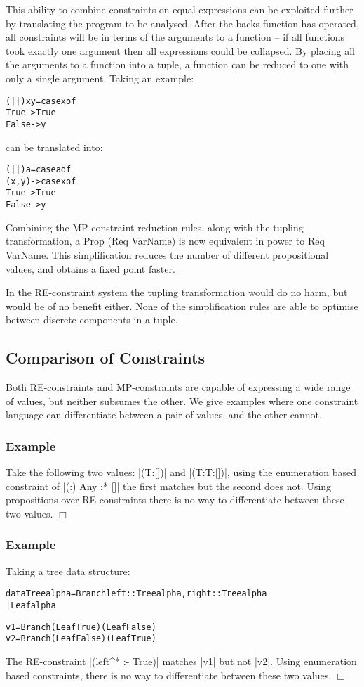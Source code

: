 \documentclass[preprint]{sigplanconf}
\newcommand{\C}[1]{\textsf{#1}}
\newcounter{exmp}
\newcommand{\yesexample}{\subsubsection*{Example \arabic{exmp}}\addtocounter{exmp}{1}}
\newcommand{\noexample}{\hfill$\Box$}
\newenvironment{code}{\begin{alltt}\small}{\end{alltt}}
\newenvironment{example}{\yesexample}{\noexample}
\begin{document}
This ability to combine constraints on equal expressions can be exploited further by translating the program to be analysed. After the \C{backs} function has operated, all constraints will be in terms of the arguments to a function -- if all functions took exactly one argument then all expressions could be collapsed. By placing all the arguments to a function into a tuple, a function can be reduced to one with only a single argument. Taking an example:

\begin{code}
(||) x y = case  x of
                 True   -> True
                 False  -> y
\end{code}

\noindent can be translated into:

\begin{code}
(||) a = case  a of
               (x,y) -> case  x of
                              True    -> True
                              False   -> y
\end{code}

Combining the MP-constraint reduction rules, along with the tupling transformation, a \C{Prop (Req VarName)} is now equivalent in power to \C{Req VarName}. This simplification reduces the number of different propositional values, and obtains a fixed point faster.

In the RE-constraint system the tupling transformation would do no harm, but would be of no benefit either. None of the simplification rules are able to optimise between discrete components in a tuple.

\subsection{Comparison of Constraints}

Both RE-constraints and MP-constraints are capable of expressing a wide range of values, but neither subsumes the other. We give examples where one constraint language can differentiate between a pair of values, and the other cannot.

\begin{example}
Take the following two values: |(T:[])| and |(T:T:[])|, using the enumeration based constraint of |{(:) Any} :* {[]}| the first matches but the second does not. Using propositions over RE-constraints there is no way to differentiate between these two values.
\end{example}

\begin{example}
Taking a tree data structure:

\begin{code}
data Tree alpha  =  Branch {left :: Tree alpha, right :: Tree alpha}
                 |  Leaf alpha

v1 = Branch (Leaf True   ) (Leaf False  )
v2 = Branch (Leaf False  ) (Leaf True   )
\end{code}

The RE-constraint |(left^* :- True)| matches |v1| but not |v2|. Using enumeration based constraints, there is no way to differentiate between these two values.
\end{example}
\end{document}
